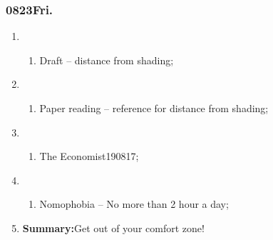 \subsubsection{0823Fri.}
\begin{enumerate}
	\item \ncquaone
	\begin{enumerate}[(1)]
		\item Draft -- distance from shading;\rightundoneBlack
	\end{enumerate}
	
	\item \ncquatwo	
	\begin{enumerate}[(1)]
		\item Paper reading -- reference for distance from shading;\rightundoneBlack
	\end{enumerate}
	
	\item \ncquathree
	\begin{enumerate}[(1)]
		\item The Economist190817;\rightundoneBlack
	\end{enumerate}
	
	\item \ncquafour	
	\begin{enumerate}[(1)]
		\item Nomophobia -- No more than 2 hour a day;\rightundoneBlack
	\end{enumerate}
	\item \textbf{Summary:}Get out of your comfort zone! 
\end{enumerate}

